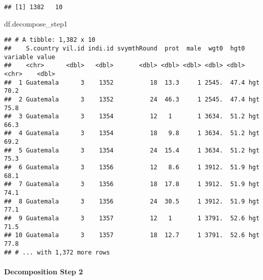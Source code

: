 \documentclass[
]{book}
\newenvironment{Shaded}{\begin{snugshade}}{\end{snugshade}}
\newcommand{\CommentTok}[1]{\textcolor[rgb]{0.56,0.35,0.01}{\textit{#1}}}
\newcommand{\DataTypeTok}[1]{\textcolor[rgb]{0.13,0.29,0.53}{#1}}
\newcommand{\DecValTok}[1]{\textcolor[rgb]{0.00,0.00,0.81}{#1}}
\newcommand{\KeywordTok}[1]{\textcolor[rgb]{0.13,0.29,0.53}{\textbf{#1}}}
\newcommand{\NormalTok}[1]{#1}
\newcommand{\OperatorTok}[1]{\textcolor[rgb]{0.81,0.36,0.00}{\textbf{#1}}}
\newcommand{\StringTok}[1]{\textcolor[rgb]{0.31,0.60,0.02}{#1}}
\begin{document}
\begin{verbatim}
## [1] 1382   10
\end{verbatim}

\begin{Shaded}
\begin{Highlighting}[]
\NormalTok{df.decompose_step1}
\end{Highlighting}
\end{Shaded}

\begin{verbatim}
## # A tibble: 1,382 x 10
##    S.country vil.id indi.id svymthRound  prot  male  wgt0  hgt0 variable value
##    <chr>      <dbl>   <dbl>       <dbl> <dbl> <dbl> <dbl> <dbl> <chr>    <dbl>
##  1 Guatemala      3    1352          18  13.3     1 2545.  47.4 hgt       70.2
##  2 Guatemala      3    1352          24  46.3     1 2545.  47.4 hgt       75.8
##  3 Guatemala      3    1354          12   1       1 3634.  51.2 hgt       66.3
##  4 Guatemala      3    1354          18   9.8     1 3634.  51.2 hgt       69.2
##  5 Guatemala      3    1354          24  15.4     1 3634.  51.2 hgt       75.3
##  6 Guatemala      3    1356          12   8.6     1 3912.  51.9 hgt       68.1
##  7 Guatemala      3    1356          18  17.8     1 3912.  51.9 hgt       74.1
##  8 Guatemala      3    1356          24  30.5     1 3912.  51.9 hgt       77.1
##  9 Guatemala      3    1357          12   1       1 3791.  52.6 hgt       71.5
## 10 Guatemala      3    1357          18  12.7     1 3791.  52.6 hgt       77.8
## # ... with 1,372 more rows
\end{verbatim}

\hypertarget{decomposition-step-2}{%
\paragraph{Decomposition Step 2}\label{decomposition-step-2}}

\begin{Shaded}
\end{Shaded}
\end{document}
